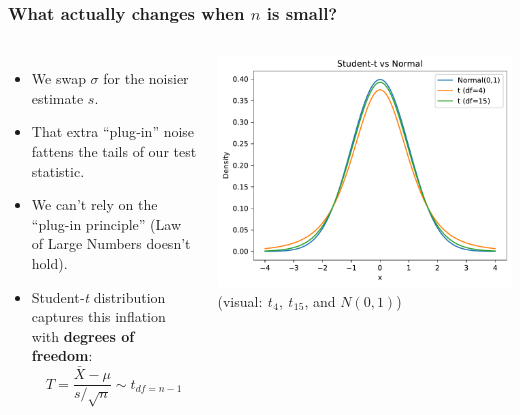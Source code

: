 \documentclass[handout]{beamer}
\begin{document}
\begin{frame}
\frametitle{What actually changes when \(n\) is small?}
\begin{columns}[T]
\small 
\begin{itemize}
  \item We swap \(\sigma\) for the noisier estimate \(s\).  
  \item That extra “plug‑in” noise fattens the tails of our test statistic.  
  \item We can't rely on the ``plug-in principle'' (Law of Large Numbers doesn't hold).
  \item Student‑\textit{t} distribution captures this inflation with \textbf{degrees of freedom}:
        \[
        T=\frac{\bar X-\mu}{s/\sqrt n}\sim t_{df=n-1}
        \]
\end{itemize}

\centering
\vspace{2em}
\includegraphics[width=\textwidth]{Figures/t_vs_norm.pdf}\\
\small (visual: \textit{t}\(_{\,4}\), \textit{t}\(_{\,15}\), and \(N(0,1)\))
\end{columns}
\end{frame}
\end{document}

